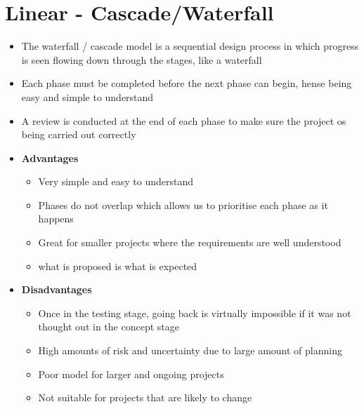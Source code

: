 \documentclass[12pt, a4, twoside]{article}
\begin{document}
  \section{Linear - Cascade/Waterfall}
  \begin{itemize}
    \item The waterfall / cascade model is a sequential design process in which progress is seen flowing down through the stages, like a waterfall
    \item Each phase must be completed before the next phase can begin, hense being easy and simple to understand
    \item A review is conducted at the end of each phase to make sure the project os being carried out correctly
    \item \textbf{Advantages}
    \begin{itemize}
      \item Very simple and easy to understand
      \item Phases do not overlap which allows us to prioritise each phase as it happens
      \item Great for smaller projects where the requirements are well understood
      \item what is proposed is what is expected
    \end{itemize}
    \item \textbf{Disadvantages}
    \begin{itemize}
      \item Once in the testing stage, going back is virtually impossible if it was not thought out in the concept stage
      \item High amounts of risk and uncertainty due to large amount of planning
      \item Poor model for larger and ongoing projects
      \item Not suitable for projects that are likely to change
    \end{itemize}
  \end{itemize}
\end{document}
